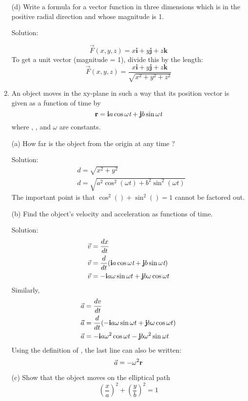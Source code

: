 \documentclass{article}
\begin{document}
\begin{enumerate}
    (d) Write a formula for a vector function in three
    dimensions which is in the positive radial direction
    and whose magnitude is 1.

    Solution:

    \[ \vec{F}(x,y,z) = x\textbf{i} + y\textbf{j} + z\textbf{k} \]
    To get a unit vector (magnitude = 1), divide this by the length:
    \[ \vec{F}(x,y,z) = \frac{x\textbf{i} + y\textbf{j} + z\textbf{k}}
    {\sqrt{x^2+y^2+z^2}} \]

    \item An object moves in the xy-plane in such a way that its position
    vector  is given as a function of time  by
    \[ \textbf{r} = \textbf{i}a\cos{\omega\textit{t}} + \textbf{j}b\sin{\omega\textit{t}} \]
    where , , and $\omega$ are constants.

    (a) How far is the object from the origin at any time ?

    Solution:
    \begin{align*}
        &d = \sqrt{x^2 + y^2} \\
        &d = \sqrt{a^2\cos^2{(\omega t)} + b^2\sin^2{(\omega t)}}
    \end{align*}
    The important point is that $\cos^2()+\sin^2() = 1$ cannot be factored out.

    (b) Find the object's velocity and acceleration as functions of time.

    Solution:
    \begin{align*}
        \vec{v} &= \frac{dx}{dt} \\
        \vec{v} &= \frac{d}{dt}(\textbf{i}a\cos{\omega\textit{t}} + \textbf{j}b\sin{\omega\textit{t}}) \\
        \vec{v} &= -\textbf{i}a\omega\sin{\omega t} + \textbf{j}b\omega\cos{\omega t}
    \end{align*}
    Similarly,
    \begin{align*}
        \vec{a} &= \frac{dv}{dt} \\
        \vec{a} &= \frac{d}{dt}(-\textbf{i}a\omega\sin{\omega t} + \textbf{j}b\omega\cos{\omega t}) \\
        \vec{a} &= -\textbf{i}a\omega^2\cos{\omega t} - \textbf{j}b\omega^2\sin{\omega t} \\
    \end{align*}
    Using the definition of , the last line can also be written:
    \[ \vec{a} = -\omega^2\textbf{r} \]

    (c) Show that the object moves on the elliptical path
    \[ {\left(\frac{x}{a}\right)}^2 + {\left(\frac{y}{b}\right)}^2 = 1\]


\end{enumerate}
\end{document}
